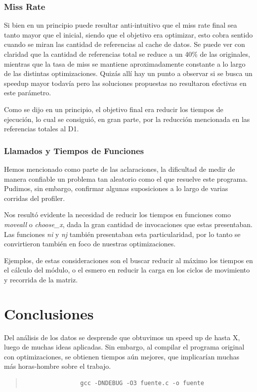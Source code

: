 \documentclass[a4paper,10pt]{article}
\begin{document}
\subsubsection{Miss Rate}

	Si bien en un principio puede resultar anti-intuitivo que el miss rate final sea tanto mayor que el inicial, siendo que el objetivo era optimizar, esto cobra sentido cuando se miran las cantidad de referencias al cache de datos. Se puede ver con claridad que la cantidad de referencias total se reduce a un 40\% de las originales, mientras que la tasa de miss se mantiene aproximadamente constante a lo largo de las distintas optimizaciones. Quiz\'as all\'i hay un punto a observar si se busca un speedup mayor todav\'ia pero las soluciones propuestas no resultaron efectivas en este par\'ametro.
	
	Como se dijo en un principio, el objetivo final era reducir los tiempos de ejecuci\'on, lo cual se consigui\'o, en gran parte, por la reducci\'on mencionada en las referencias totales al D1.
	
\subsubsection{Llamados y Tiempos de Funciones}

	Hemos mencionado como parte de las aclaraciones, la dificultad de medir de manera confiable un problema tan aleatorio como el que resuelve este programa. Pudimos, sin embargo, confirmar algunas suposiciones a lo largo de varias corridas del profiler. 
	
	Nos result\'o evidente la necesidad de reducir los tiempos en funciones como \textit{moveall} o \textit{choose\_x}, dada la gran cantidad de invocaciones que estas presentaban. Las funciones \textit{ni} y \textit{nj} tambi\'en presentaban esta particularidad, por lo tanto se convirtieron tambi\'en en foco de nuestras optimizaciones.
	
	Ejemplos, de estas consideraciones son el buscar reducir al m\'aximo los tiempos en el c\'alculo del m\'odulo, o el esmero en reducir la carga en los ciclos de movimiento y recorrida de la matriz.
	
\section{Conclusiones}

    Del an\'alisis de los datos se desprende que obtuvimos un speed up de hasta X, luego de muchas ideas aplicadas. Sin embargo, al compilar el programa original con optimizaciones, se obtienen tiempos a\'un mejores, que implicar\'ian muchas m\'as horas-hombre sobre el trabajo.
		\begin{quote}
			\begin{verbatim}
				gcc -DNDEBUG -O3 fuente.c -o fuente
			\end{verbatim}
		\end{quote}
\end{document}
